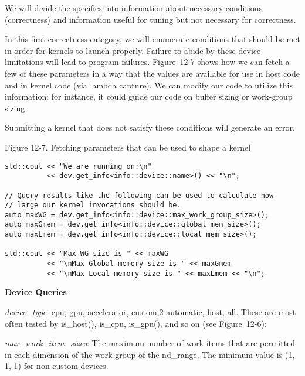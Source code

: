 We will divide the specifics into information about necessary conditions (correctness) and information useful for tuning but not necessary for correctness.\par

In this first correctness category, we will enumerate conditions that should be met in order for kernels to launch properly. Failure to abide by these device limitations will lead to program failures. Figure 12-7 shows how we can fetch a few of these parameters in a way that the values are available for use in host code and in kernel code (via lambda capture). We can modify our code to utilize this information; for instance, it could guide our code on buffer sizing or work-group sizing.\par

\begin{tcolorbox}[colback=red!5!white,colframe=red!75!black]
Submitting a kernel that does not satisfy these conditions will generate an error.
\end{tcolorbox}

\hspace*{\fill} \par %
Figure 12-7. Fetching parameters that can be used to shape a kernel
\begin{lstlisting}[caption={}]
std::cout << "We are running on:\n"
		  << dev.get_info<info::device::name>() << "\n";

// Query results like the following can be used to calculate how
// large our kernel invocations should be.
auto maxWG = dev.get_info<info::device::max_work_group_size>();
auto maxGmem = dev.get_info<info::device::global_mem_size>();
auto maxLmem = dev.get_info<info::device::local_mem_size>();

std::cout << "Max WG size is " << maxWG
		  << "\nMax Global memory size is " << maxGmem
		  << "\nMax Local memory size is " << maxLmem << "\n";
\end{lstlisting}

\hspace*{\fill} \par %
\textbf{Device Queries}

\textit{device\_type}: cpu, gpu, accelerator, custom,2 automatic, host, all. These are most often tested by is\_host(), is\_cpu, is\_gpu(), and so on (see Figure 12-6):\par

\textit{max\_work\_item\_sizes}: The maximum number of work-items that are permitted in each dimension of the work-group of the nd\_range. The minimum value is (1, 1, 1) for non-custom devices.\par

